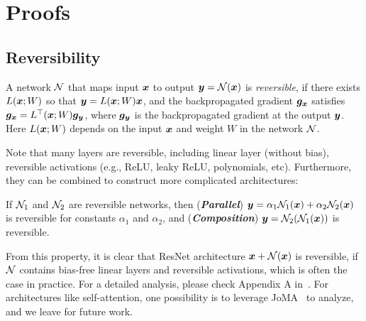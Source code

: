 \def\vec{\mathrm{vec}}

\section{Proofs}

\def\dd{\mathrm{d}}
\def\tr{\mathrm{tr}}
\def\rank{\mathrm{rank}}

\subsection{Reversibility}
\label{sec:reversibility}
\begin{definition}
A network $\mathcal{N}$ that maps input ${\bm{x}}$ to output ${\bm{y}} = \mathcal{N}({\bm{x}})$ is \emph{reversible}, if there exists $L({\bm{x}}; W)$ so that  ${\bm{y}}= L({\bm{x}}; W){\bm{x}}$, and the backpropagated gradient ${\bm{g}}_{\bm{x}}$ satisfies ${\bm{g}}_{\bm{x}} = L^\top({\bm{x}}; W) {\bm{g}}_{\bm{y}}$, where ${\bm{g}}_{\bm{y}}$ is the backpropagated gradient at the output ${\bm{y}}$. Here $L({\bm{x}};W)$ depends on the input ${\bm{x}}$ and weight $W$ in the network $\mathcal{N}$. 
\end{definition}

Note that many layers are reversible, including linear layer (without bias), reversible activations (e.g., ReLU, leaky ReLU, polynomials, etc). Furthermore, they can be combined to construct more complicated architectures: 
\begin{property}
If $\mathcal{N}_1$ and $\mathcal{N}_2$ are reversible networks, then (\emph{\textbf{Parallel}}) ${\bm{y}} = \alpha_1 \mathcal{N}_1({\bm{x}}) + \alpha_2 \mathcal{N}_2({\bm{x}})$ is reversible for constants $\alpha_1$ and $\alpha_2$, and (\emph{\textbf{Composition}}) ${\bm{y}} = \mathcal{N}_2(\mathcal{N}_1({\bm{x}}))$ is reversible. 
\end{property}
From this property, it is clear that ResNet architecture ${\bm{x}} + \mathcal{N}({\bm{x}})$ is reversible, if $\mathcal{N}$ contains bias-free linear layers and reversible activations, which is often the case in practice. For a detailed analysis, please check Appendix A in~\cite{tian2020understanding}. For architectures like self-attention, one possibility is to leverage JoMA~\cite{tian2023joma} to analyze, and we leave for future work.  

